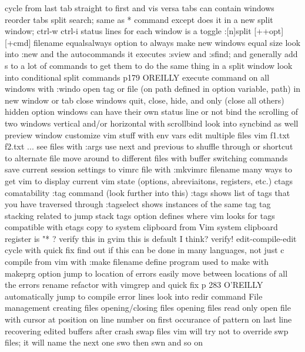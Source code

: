 \documentclass[12pt]{book}
\begin{document}
{{        cycle from last tab straight to first and vis versa
        tabs can contain windows
        reorder tabs
      split search; same as * command except does it in a new split window; ctrl-w ctrl-i
      status lines for each window is a toggle
      :[n]split [++opt] [+cmd] filename
      equalsalways option to always make new windows equal size
      look into :new and the autocommands it executes
      :sview and :sfind; and generally add s to a lot of commands to get them to do the same thing in a split window
      look into conditional split commands p179 OREILLY
      execute command on all windows with :windo
      open tag or file (on path defined in option variable, path) in new window or tab
      close windows
        quit, close, hide, and only (close all others)
          hidden option
      windows can have their own status line or not
      bind the scrolling of two windows vertical and/or horizontal with scrollbind
        look into syncbind as well
      preview window
    customize vim stuff with env vars
    edit multiple files
      vim f1.txt f2.txt ...
      see files with :args
      use next and previous to shuffle through or shortcut to alternate file
    move around to different files with buffer switching commands
    save current session settings to vimrc file with :mkvimrc filename
  many ways to get vim to display current vim state (options, abreviaitons, registers, etc.)
  ctags comatability
    :tag command (look further into this)
    :tags shows list of tags that you have traversed through
    :tagselect shows instances of the same tag
    tag stacking
      related to jump stack
    tags option defines where vim looks for tags
    compatible with etags
  copy to system clipboard from Vim
    system clipboard register is "* ?  verify this
    in gvim this is default I think? verify!
  edit-compile-edit cycle with quick fix
    find out if this can be done in many languages, not just c
    compile from vim with :make filename
    define program used to make with makeprg option
    jump to location of errors
    easily move between locations of all the errors
  rename refactor with vimgrep and quick fix
    p 283 O'REILLY
  automatically jump to compile error lines
    look into redir command
  File management
    creating files
    opening/closing files
    opening files read only
    open file with cursor at position
      on line number
      on first occurance of pattern
      on last line
    recovering edited buffers after crash
      swap files
      vim will try not to override swp files; it will name the next one swo then swn and so on
}}
\end{document}
